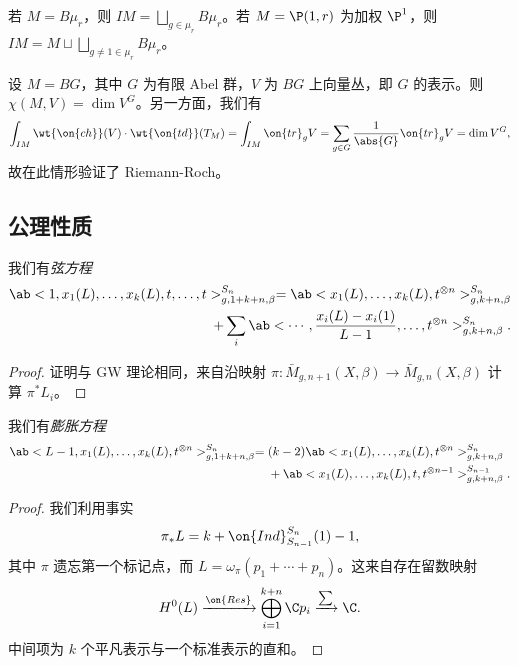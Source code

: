 \begin{exm}
    若 \(M = B\mu_r\)，则 \(IM = \bigsqcup_{g \in \mu_r} B \mu_r\)。若 \(M = \P(1, r)\) 为加权 \(\P^1\)，则 \(IM = M \sqcup \bigsqcup_{g \neq 1 \in \mu_r} B\mu_r\)。
\end{exm}

\begin{exm}
    设 \(M = BG\)，其中 \(G\) 为有限 Abel 群，\(V\) 为 \(BG\) 上向量丛，即 \(G\) 的表示。则 \(\chi(M, V) = \dim V^G\)。另一方面，我们有
    \[ \int_{IM} \wt{\on{ch}}(V) \cdot \wt{\on{td}}(T_M) = \int_{IM} \on{tr}_g V = \sum_{g \in G} \frac{1}{\abs{G}} \on{tr}_g V = \dim V^G, \]
    故在此情形验证了 Riemann-Roch。
\end{exm}

\subsection{公理性质}%
\label{sub:Axiomatic properties}

\begin{lem}
    我们有\textit{弦方程}
    \begin{align*}
        \ab< 1, x_1(L), \ldots, x_k(L), t, \ldots, t >_{g, 1+k+n, \beta}^{S_n} = \ab<x_1(L), \ldots, x_k(L), t^{\otimes n}>^{S_n}_{g,k+n,\beta} \\
        + \sum_i \ab< \cdots, \frac{x_i(L) - x_i(1)}{L-1}, \ldots, t^{\otimes n}>^{S_n}_{g,k+n,\beta}.
    \end{align*}
\end{lem}

\begin{proof}
    证明与 GW 理论相同，来自沿映射 \(\pi \colon\bar{M}_{g,n+1}(X,\beta) \to \bar{M}_{g,n}(X,\beta)\) 计算 \(\pi^* L_i\)。
\end{proof}

\begin{lem}
    我们有\textit{膨胀方程}
    \begin{align*}
        \ab<L-1, x_1(L), \ldots, x_k(L), t^{\otimes n}>_{g,1+k+n,\beta}^{S_n} ={}& (k-2)\ab<x_1(L), \ldots, x_k(L), t^{\otimes n}>_{g,k+n,\beta}^{S_n} \\
        &+ \ab<x_1(L), \ldots, x_k(L), t, t^{\otimes n-1}>_{g,k+n,\beta}^{S_{n-1}}.
    \end{align*}
\end{lem}

\begin{proof}
    我们利用事实
    \[ \pi_* L = k + \on{Ind}_{S_{n-1}}^{S_n}(1) - 1, \]
    其中 \(\pi\) 遗忘第一个标记点，而 \(L = \omega_{\pi} (p_1 + \cdots + p_n)\)。这来自存在留数映射
    \[ H^0(L) \xrightarrow{\on{Res}} \bigoplus_{i=1}^{k+n} \C p_i \xrightarrow{\sum} \C. \]
    中间项为 \(k\) 个平凡表示与一个标准表示的直和。
\end{proof}

